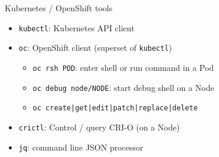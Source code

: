 \begin{frame}{Kubernetes / OpenShift tools}
\protect\hypertarget{openshift-tools}{}
\begin{itemize}
\item {\tt kubectl}: Kubernetes API client
\item {\tt oc}: OpenShift client (superset of {\tt kubectl})
    \begin{itemize}
    \item {\tt oc rsh POD}: enter shell or run command in a Pod
    \item {\tt oc debug node/NODE}: start debug shell on a Node
    \item {\tt oc create|get|edit|patch|replace|delete}
    \end{itemize}
\item {\tt crictl}: Control / query CRI-O (on a Node)
\item {\tt jq}: command line JSON processor
\end{itemize}
\end{frame}
